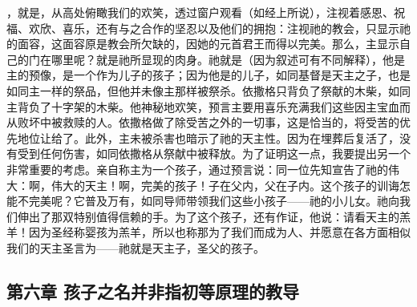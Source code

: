 ，就是，从高处俯瞰我们的欢笑，透过窗户观看（如经上所说），注视着感恩、祝福、欢欣、喜乐，还有与之合作的坚忍以及他们的拥抱：注视祂的教会，只显示祂的面容，这面容原是教会所欠缺的，因她的元首君王而得以完美。那么，主显示自己的门在哪里呢？就是祂所显现的肉身。祂就是（因为叙述可有不同解释），他是主的预像，是一个作为儿子的孩子；因为他是的儿子，如同基督是天主之子，也是如同主一样的祭品，但他并未像主那样被祭杀。依撒格只背负了祭献的木柴，如同主背负了十字架的木柴。他神秘地欢笑，预言主要用喜乐充满我们这些因主宝血而从败坏中被救赎的人。依撒格做了除受苦之外的一切事，这是恰当的，将受苦的优先地位让给了。此外，主未被杀害也暗示了祂的天主性。因为在埋葬后复活了，没有受到任何伤害，如同依撒格从祭献中被释放。为了证明这一点，我要提出另一个非常重要的考虑。亲自称主为一个孩子，通过预言说：同一位先知宣告了祂的伟大：啊，伟大的天主！啊，完美的孩子！子在父内，父在子内。这个孩子的训诲怎能不完美呢？它普及万有，如同导师带领我们这些小孩子——祂的小儿女。祂向我们伸出了那双特别值得信赖的手。为了这个孩子，还有作证，他说：请看天主的羔羊！因为圣经称婴孩为羔羊，所以也称那为了我们而成为人、并愿意在各方面相似我们的天主圣言为——祂就是天主子，圣父的孩子。\par


\subsection{第六章 孩子之名并非指初等原理的教导}


